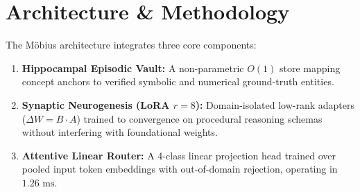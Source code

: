 \documentclass[10pt,twocolumn,letterpaper]{article}
\begin{document}
\section{Architecture & Methodology}
The Möbius architecture integrates three core components:
\begin{enumerate}
    \item \textbf{Hippocampal Episodic Vault:} A non-parametric $O(1)$ store mapping concept anchors to verified symbolic and numerical ground-truth entities.
    \item \textbf{Synaptic Neurogenesis (LoRA $r=8$):} Domain-isolated low-rank adapters ($\Delta W = B \cdot A$) trained to convergence on procedural reasoning schemas without interfering with foundational weights.
    \item \textbf{Attentive Linear Router:} A 4-class linear projection head trained over pooled input token embeddings with out-of-domain rejection, operating in $1.26\text{ ms}$.
\end{enumerate}
\end{document}
